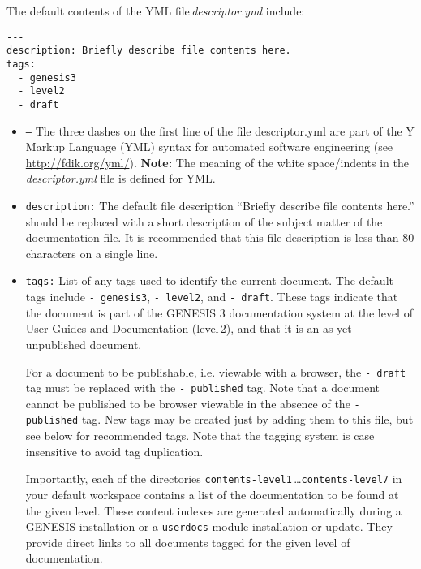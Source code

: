 \documentclass[12pt]{article}
\begin{document}
The default contents of the YML file\,{\it descriptor.yml} include:

\begin{verbatim}
---
description: Briefly describe file contents here. 
tags:
  - genesis3
  - level2
  - draft
\end{verbatim}

\begin{itemize}

\item {\tt ---} The three dashes on the first line of the file descriptor.yml are part of the Y Markup Language (YML) syntax for automated software engineering (see \href{http://fdik.org/yml/}{http://fdik.org/yml/}). {\bf Note:} The meaning of the white space/indents in the\,{\it descriptor.yml} file is defined for YML.  

\item {\tt description:} The default file description ``Briefly describe file contents here.'' should be replaced with a short description of the subject matter of the documentation file. It is recommended that this file description is less than 80 characters on a single line.

\item {\tt tags:} List of any tags used to identify the current document. The default tags include {\tt -\,genesis3}, {\tt -\,level2}, and {\tt -\,draft}. These tags indicate that the document is part of the GENESIS 3 documentation system at the level of User Guides and Documentation (level\,2), and that it is an as yet unpublished document.

For a document to be publishable, i.e. viewable with a browser, the {\tt -\,draft} tag must be replaced with the {\tt -\,published} tag. Note that a document cannot be published to be browser viewable in the absence of the {\tt -\,published} tag. New tags may be created just by adding them to this file, but see below for recommended tags.  Note that the tagging system is case insensitive to avoid tag duplication.

Importantly, each of the directories {\tt contents-level1}\,\ldots {\tt contents-level7} in your default workspace contains a list of the documentation to be found at the given level. These content indexes are generated automatically during a GENESIS installation or a {\tt userdocs} module installation or update. They provide direct links to all documents tagged for the given level of documentation.

\end{itemize}
\end{document}
